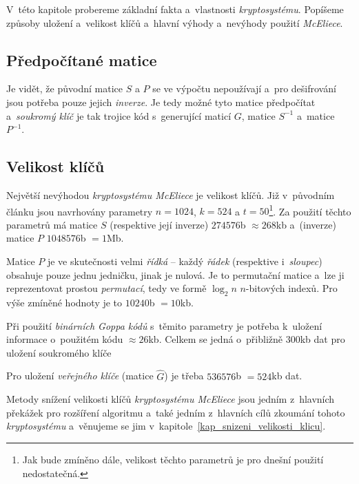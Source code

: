 \documentclass[thesis=M,czech,hidelinks]{FITthesis}[2012/06/26]
\newcommand{\0}{{\textcolor[gray]{0.75}{0}}}
\begin{document}
V~této kapitole probereme základní fakta a~vlastnosti \emph{kryptosystému}.
Popíšeme způsoby uložení a~velikost klíčů a~hlavní výhody a~nevýhody použití
\emph{McEliece}.


\subsection{Předpočítané matice}

Je vidět, že původní matice $S$ a $P$ se ve výpočtu nepoužívají a~pro
dešifrování jsou potřeba pouze jejich \emph{inverze}. Je tedy možné tyto matice
předpočítat a~\emph{soukromý klíč} je tak trojice kód s~generující maticí $G$,
matice $S^{-1}$ a~matice~$P^{-1}$.


\subsection{Velikost klíčů}\label{kap_velikost_klicu}

Největší nevýhodou \emph{kryptosystému McEliece} je velikost klíčů. Již
v~původním článku jsou navrhovány parametry $n=1024$, $k=524$ a $t=50$\footnote{
    Jak bude zmíněno dále, velikost těchto parametrů je pro dnešní použití
    nedostatečná.
}. Za použití těchto parametrů má matice $S$ (respektive její inverze)
$274576$\;b $\approx 268$\;kb a~(inverze) matice $P$ $1048576$\;b $= 1$\;Mb.

Matice $P$ je ve skutečnosti velmi \emph{řídká} -- každý \emph{řádek}
(respektive i~\emph{sloupec}) obsahuje pouze jednu jedničku, jinak je nulová. Je
to permutační matice a~lze ji reprezentovat prostou \emph{permutací}, tedy ve
formě $\log_2 n$ $n$-bitových indexů. Pro výše zmíněné hodnoty je to $10240$\;b
$=10$\;kb.

Při použití \emph{binárních Goppa kódů} s~těmito parametry je potřeba k~uložení
informace o~použitém kódu $\approx 26$\;kb. Celkem se jedná o~přibližně
$300$\;kb dat pro uložení soukromého klíče

Pro uložení \emph{veřejného klíče} (matice $\hat{G}$) je třeba $536576$\;b
$=524$\;kb dat.

Metody snížení velikosti klíčů \emph{kryptosystému McEliece} jsou jedním
z~hlavních překážek pro rozšíření algoritmu a~také jedním z~hlavních cílů
zkoumání tohoto \emph{kryptosystému} a~věnujeme se jim
v~kapitole~\ref{kap_snizeni_velikosti_klicu}.
\end{document}
